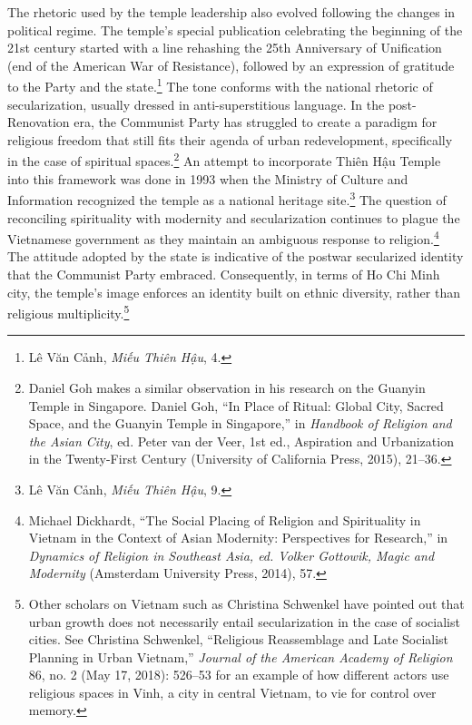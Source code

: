 The rhetoric used by the temple leadership also evolved following the changes in political regime. The temple's special publication celebrating the beginning of the 21st century started with a line rehashing the 25th Anniversary of Unification (end of the American War of Resistance), followed by an expression of gratitude to the Party and the state.\footnote{Lê Văn Cảnh, \textit{Miếu Thiên Hậu}, 4.} The tone conforms with the national rhetoric of secularization, usually dressed in anti-superstitious language. In the post-Renovation era, the Communist Party has struggled to create a paradigm for religious freedom that still fits their agenda of urban redevelopment, specifically in the case of spiritual spaces.\footnote{Daniel Goh makes a similar observation in his research on the Guanyin Temple in Singapore. Daniel Goh, “In Place of Ritual: Global City, Sacred Space, and the Guanyin Temple in Singapore,” in \textit{Handbook of Religion and the Asian City}, ed. Peter van der Veer, 1st ed., Aspiration and Urbanization in the Twenty-First Century (University of California Press, 2015), 21–36.} An attempt to incorporate Thiên Hậu Temple into this framework was done in 1993 when the Ministry of Culture and Information recognized the temple as a national heritage site.\footnote{Lê Văn Cảnh, \textit{Miếu Thiên Hậu}, 9.} The question of reconciling spirituality with modernity and secularization continues to plague the Vietnamese government as they maintain an ambiguous response to religion.\footnote{Michael Dickhardt, “The Social Placing of Religion and Spirituality in Vietnam in the Context of Asian Modernity: Perspectives for Research,” in \textit{Dynamics of Religion in Southeast Asia, ed. Volker Gottowik, Magic and Modernity} (Amsterdam University Press, 2014), 57.} The attitude adopted by the state is indicative of the postwar secularized identity that the Communist Party embraced. Consequently, in terms of Ho Chi Minh city, the temple's image enforces an identity built on ethnic diversity, rather than religious multiplicity.\footnote{Other scholars on Vietnam such as Christina Schwenkel have pointed out that urban growth does not necessarily entail secularization in the case of socialist cities. See Christina Schwenkel, “Religious Reassemblage and Late Socialist Planning in Urban Vietnam,” \textit{Journal of the American Academy of Religion} 86, no. 2 (May 17, 2018): 526–53 for an example of how different actors use religious spaces in Vinh, a city in central Vietnam, to vie for control over memory.}

